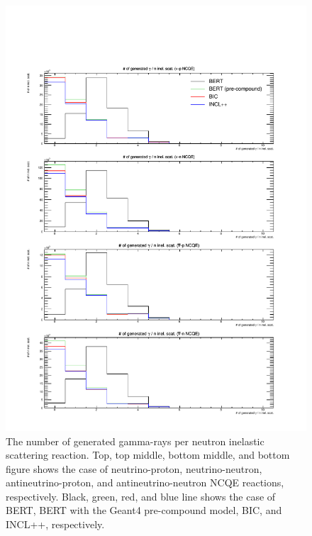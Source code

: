 \begin{figure}[h]
	\centering
	\includegraphics[width=16cm]{PDF/Secondary/Comparison_PreCompound/gamma/pdf1/NumSecIne}
	\caption[The number of generated gamma-rays per neutron inelastic scattering reaction]{
	The number of generated gamma-rays per neutron inelastic scattering reaction.
	Top, top middle, bottom middle, and bottom figure shows the case of neutrino-proton, neutrino-neutron, antineutrino-proton, and antineutrino-neutron NCQE reactions, respectively.
	Black, green, red, and blue line shows the case of BERT, BERT with the Geant4 pre-compound model, BIC, and INCL++, respectively.
	}\label{Others_gamma_NumSecIne}
\end{figure}

